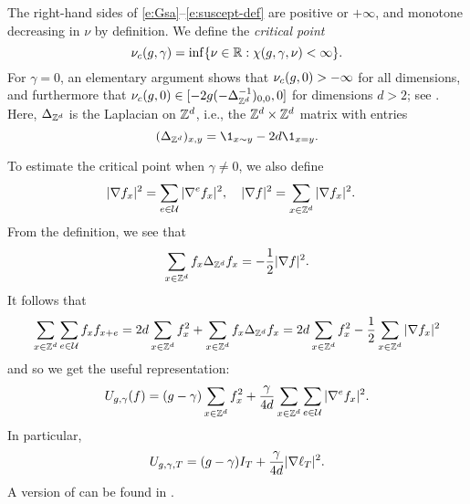 The right-hand sides of \eqref{e:Gsa}--\eqref{e:suscept-def} %
are positive or $+\infty$,
and %
monotone decreasing in $\nu$ by definition.
We define the \emph{critical point}
\begin{equation}
\label{e:nuc-def}
\nu_c(g, \gamma) = \inf \{ \nu \in {\mathbb R} : \chi(g, \gamma, \nu) < \infty \} .
\end{equation}
For $\gamma=0$, an elementary argument
shows that $\nu_c(g,0) > -\infty$ for all dimensions, and furthermore
that $\nu_c(g, 0) \in [ -2  g(-\Delta_{{ {{\mathbb Z}}^d }}^{-1})_{0,0}, 0]$ for dimensions $d>2$;
see \cite[Lemma~\ref{log-lem:csub}]{BBS-saw4-log}.
Here, $\Delta_{{ {{\mathbb Z}}^d }}$ is the Laplacian on ${ {{\mathbb Z}}^d }$, i.e., the ${ {{\mathbb Z}}^d } \times { {{\mathbb Z}}^d }$
matrix with entries
\begin{equation}
\label{e:Deltaxy}
(\Delta_{\Zd})_{x, y} = \1_{x\sim y} - 2 d \1_{x=y}.
\end{equation}

To estimate the critical point when $\gamma \neq 0$,
we also define
\begin{align} \label{e:nabladef}
    |\nabla f_x|^2 &= \sum_{e\in\mathcal{U}}
    |\nabla^e f_x|^2,
    \quad
    |\nabla f|^2 = \sum_{x\in{ {{\mathbb Z}}^d }} |\nabla f_x|^2.
\end{align}
From the definition, we see that
\begin{equation}
\label{e:sbp}
\sum_{x\in{ {{\mathbb Z}}^d }}   f_x \Delta_{{ {{\mathbb Z}}^d }} f_x
=
-\frac{1}{2} |\nabla f|^2.
\end{equation}
It follows that
\begin{equation}
\sum_{x\in{ {{\mathbb Z}}^d }} \sum_{e\in\mathcal{U}} f_x f_{x+e}
=
2 d \sum_{x\in{ {{\mathbb Z}}^d }} f_x^2
+ \sum_{x\in{ {{\mathbb Z}}^d }} f_x \Delta_{{ {{\mathbb Z}}^d }} f_x
=
2 d \sum_{x\in{ {{\mathbb Z}}^d }} f_x^2
- \frac{1}{2} \sum_{x\in{ {{\mathbb Z}}^d }} |\nabla f_x|^2
\end{equation}
and so we get the useful representation:
\begin{equation}
\label{e:Udef-pos}
U_{g,\gamma}(f)
= (g - \gamma) \sum_{x\in{ {{\mathbb Z}}^d }} f_x^2
+ \frac{\gamma}{4d} \sum_{x\in{ {{\mathbb Z}}^d }} \sum_{e\in\mathcal{U}} |\nabla^e f_x|^2.
\end{equation}
In particular,
\begin{equation}
  \label{e:V2}
  U_{g,\gamma,T} =
  (g - \gamma) I_T
  + \frac{\gamma}{4d}
  |\nabla \ell_T|^2
  .
\end{equation}
A version of  can be found in \cite{HK01a}.

